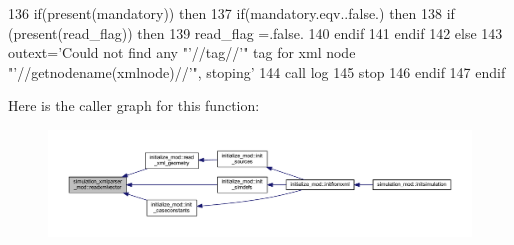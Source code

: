 \begin{DoxyCode}
136         \textcolor{keywordflow}{if}(\textcolor{keyword}{present}(mandatory)) \textcolor{keywordflow}{then}
137             \textcolor{keywordflow}{if}(mandatory.eqv..false.) \textcolor{keywordflow}{then}
138               \textcolor{keywordflow}{if} (\textcolor{keyword}{present}(read\_flag)) \textcolor{keywordflow}{then}
139                 read\_flag =.false.
140 \textcolor{keywordflow}{              endif}
141 \textcolor{keywordflow}{            endif}
142         \textcolor{keywordflow}{else}
143             outext=\textcolor{stringliteral}{'Could not find any "'}//tag//\textcolor{stringliteral}{'" tag for xml node "'}//getnodename(xmlnode)//\textcolor{stringliteral}{'", stoping'}
144             \textcolor{keyword}{call }log%
145             stop
146 \textcolor{keywordflow}{        endif}
147 \textcolor{keywordflow}{    endif}
\end{DoxyCode}
Here is the caller graph for this function\+:\nopagebreak
\begin{figure}[H]
\begin{center}
\leavevmode
\includegraphics[width=350pt]{namespacesimulation__xmlparser__mod_a48bcd153bef2149410d66842b564728d_icgraph}
\end{center}
\end{figure}
